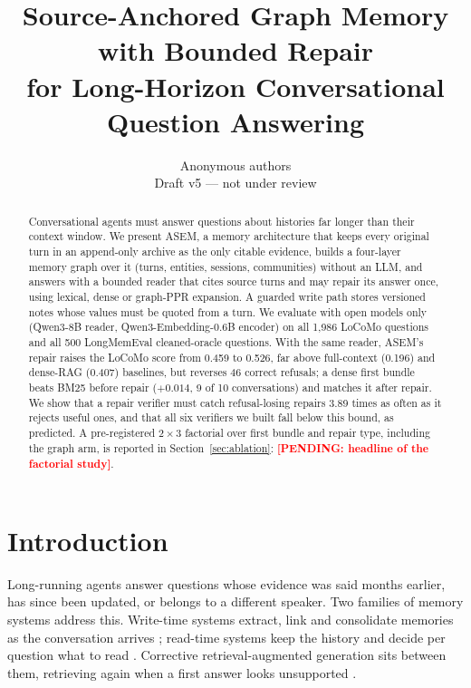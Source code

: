 \documentclass[10pt]{article}
\title{\textbf{Source-Anchored Graph Memory with Bounded Repair\\
for Long-Horizon Conversational Question Answering}}
\author{Anonymous authors\\ \small Draft v5 --- not under review}
\date{}
\theoremstyle{plain}
\theoremstyle{definition}
\newcommand{\asem}{\textsc{ASEM}}
\newcommand{\pending}[1]{\textcolor{red}{\textbf{[PENDING: #1]}}}
\begin{document}
\maketitle

\begin{abstract}
Conversational agents must answer questions about histories far longer than their context
window. We present \asem{}, a memory architecture that keeps every original turn in an
append-only archive as the only citable evidence, builds a four-layer memory graph over it
(turns, entities, sessions, communities) without an LLM, and answers with a bounded reader that
cites source turns and may repair its answer once, using lexical, dense or graph-PPR expansion.
A guarded write path stores versioned notes whose values must be quoted from a turn. We evaluate
with open models only (Qwen3-8B reader, Qwen3-Embedding-0.6B encoder) on all 1,986 LoCoMo questions
and all 500 LongMemEval cleaned-oracle questions. With the same reader, \asem{}'s repair raises the
LoCoMo score from 0.459 to 0.526, far above full-context (0.196) and dense-RAG (0.407) baselines, but
reverses 46 correct refusals; a dense first bundle beats BM25 before repair ($+0.014$, 9 of 10
conversations) and matches it after repair. We show that a repair verifier must catch refusal-losing
repairs 3.89 times as often as it rejects useful ones, and that all six verifiers we built fall below
this bound, as predicted. A pre-registered $2\times3$ factorial over first bundle and repair type,
including the graph arm, is reported in Section~\ref{sec:ablation}: \pending{headline of the factorial
study}.
\end{abstract}

\section{Introduction}
\label{sec:intro}

Long-running agents answer questions whose evidence was said months earlier, has since been
updated, or belongs to a different speaker. Two families of memory systems address this. Write-time
systems extract, link and consolidate memories as the conversation arrives
\citep{packer2023memgpt,chhikara2025mem0,amem2025,memoryr12025,cao2026higmem}; read-time systems keep
the history and decide per question what to read \citep{du2026memr3,wang2026cuemem,liu2026livectx,chen2026justmem,yu2026lazymem}.
Corrective retrieval-augmented generation sits between them, retrieving again when a first answer
looks unsupported \citep{jiang2023active,asai2023selfrag,yan2024crag}.
\end{document}
